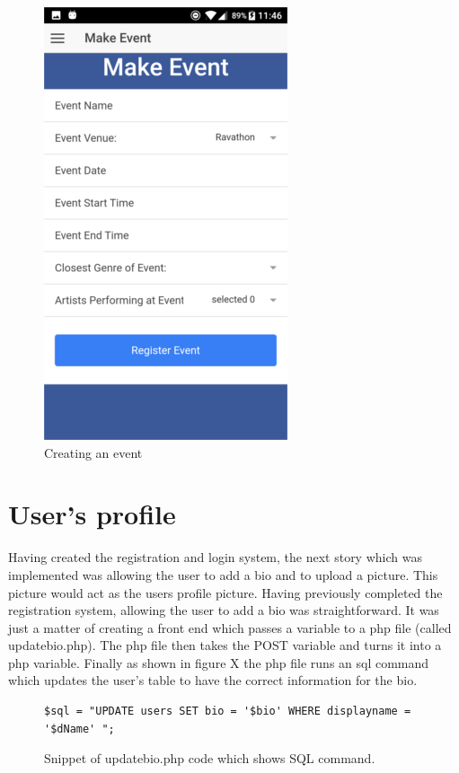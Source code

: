 \begin{center}
\begin{figure}[H]
\includegraphics[scale=0.5]{images/sc18}
\caption{Creating an event}
\end{figure}
\end{center}

\section{User's profile}
Having created the registration and login system, the next story which was implemented was allowing the user to add a bio and to upload a picture. This picture would act as the users profile picture. Having previously completed the registration system, allowing the user to add a bio was straightforward. It was just a matter of creating a front end which passes a variable to a php file (called updatebio.php). The php file then takes the POST variable and turns it into a php variable. Finally as shown in figure X the php file runs an sql command which updates the user's table to have the correct information for the bio.

\begin{figure}[H]
\begin{verbatim}
$sql = "UPDATE users SET bio = '$bio' WHERE displayname = '$dName' ";
\end{verbatim}
\caption{Snippet of updatebio.php code which shows SQL command.}
\end{figure}

